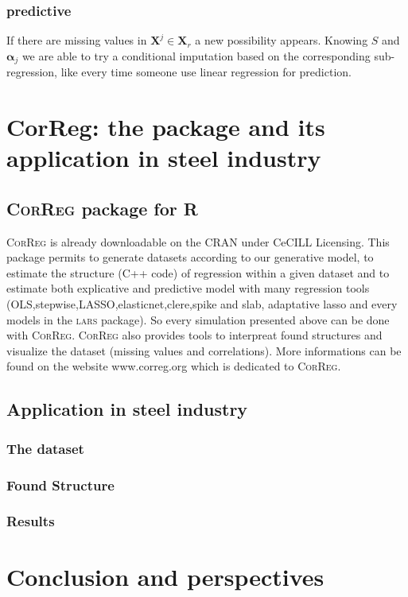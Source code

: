 \documentclass[11pt,a4paper]{report}
\begin{document}
		\subsection{predictive}
			If there are missing values in $\boldsymbol{X}^j \in \boldsymbol{X}_r$ a new possibility appears. Knowing $S$ and $\boldsymbol{\alpha}_j$ we are able to try a conditional imputation based on the corresponding sub-regression, like every time someone use linear regression for prediction. 
\chapter{CorReg: the package and its application in steel industry}	
	\section{\textsc{CorReg} package for R}
	\textsc{CorReg} is already downloadable on the CRAN under CeCILL Licensing. This package permits to generate datasets according to our generative model, to estimate the structure (C++ code) of regression within a given dataset and to estimate both explicative and predictive model with many regression tools (OLS,stepwise,LASSO,elasticnet,clere,spike and slab, adaptative lasso and every models in the \textsc{lars} package). So every simulation presented above can be done with \textsc{CorReg}.
	\textsc{CorReg} also provides tools to interpreat found structures and visualize the dataset (missing values and correlations). More informations can be found on the website www.correg.org which is dedicated to \textsc{CorReg}.
	\section{Application in steel industry}
		\subsection{The dataset}
		\subsection{Found Structure}
		\subsection{Results}
\chapter{Conclusion and perspectives}
\end{document}
